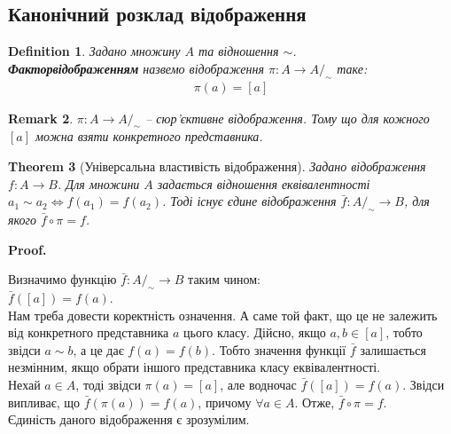 \documentclass[a4paper, 14pt]{extarticle}
\makeatletter
\theoremstyle{theoremdd}
\newtheorem{theorem}{Theorem}[subsection]
\theoremstyle{theoremdd}
\newtheorem{definition}[theorem]{Definition}
\theoremstyle{theoremdd}
\theoremstyle{theoremdd}
\theoremstyle{theoremdd}
\theoremstyle{theoremdd}
\theoremstyle{theoremdd}
\theoremstyle{theoremdd}
\theoremstyle{theoremdd}
\theoremstyle{theoremdd}
\theoremstyle{theoremdd}
\newtheorem{remark}[theorem]{Remark}
\theoremstyle{theoremdd}
\theoremstyle{theoremdd}
\theoremstyle{theoremdd}
\theoremstyle{theoremdd}
\renewenvironment{proof}[1][Proof.\\]{\par
\pushQED{\hfill \qed}%
\normalfont \topsep6\p@\@plus6\p@\relax
\trivlist
\item\relax
{\bfseries
#1\@addpunct{.}}\hspace\labelsep\ignorespaces
}{%
\popQED\endtrivlist\@endpefalse
}
\makeatother
\begin{document}
\subsection{Канонічний розклад відображення}
\begin{definition}
Задано множину $A$ та відношення $\sim$.\\
\textbf{Факторвідображенням} назвемо відображення $\pi \colon A \to A/_\sim$ таке:
\begin{align*}
\pi(a) = [a]
\end{align*}
\end{definition}

\begin{remark}
$\pi \colon A \to A/_\sim$ -- сюр'єктивне відображення. Тому що для кожного $[a]$ можна взяти конкретного представника.
\end{remark}

\begin{theorem}[Універсальна властивість відображення]
Задано відображення $f \colon A \to B$. Для множини $A$ задається відношення еквівалентності $a_1 \sim a_2 \iff f(a_1) = f(a_2)$. Тоді існує єдине відображення $\bar{f} \colon A/_\sim \to B$, для якого $\bar{f} \circ \pi = f$.
\begin{figure}[H]
\centering
{}
\end{figure}
\end{theorem}

\begin{proof}
Визначимо функцію $\bar{f} \colon A/_\sim \to B$ таким чином:\\
$\bar{f}([a]) = f(a)$.\\
Нам треба довести коректність означення. А саме той факт, що це не залежить від конкретного представника $a$ цього класу. Дійсно, якщо $a,b \in [a]$, тобто звідси $a \sim b$, а це дає $f(a) = f(b)$. Тобто значення функції $\bar{f}$ залишається незмінним, якщо обрати іншого представника класу еквівалентності.\\
Нехай $a \in A$, тоді звідси $\pi(a) = [a]$, але водночас $\bar{f}([a]) = f(a)$. Звідси випливає, що $\bar{f}(\pi(a)) = f(a)$, причому $\forall a \in A$. Отже, $\bar{f} \circ \pi = f$.\\
Єдиність даного відображення є зрозумілим.
\end{proof}
\end{document}
